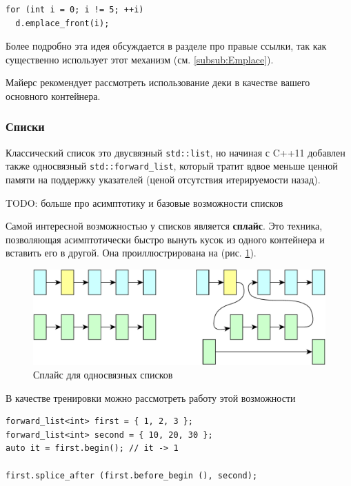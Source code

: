 \documentclass[a4paper,12pt,oneside]{article}
\begin{document}
\begin{lstlisting}
for (int i = 0; i != 5; ++i)
  d.emplace_front(i);
\end{lstlisting}

Более подробно эта идея обсуждается в разделе про правые ссылки, так как существенно использует этот механизм (см. \ref{subsub:Emplace}).

Майерс \cite{effmoderncpp} рекомендует рассмотреть использование деки в качестве вашего основного контейнера.

\subsubsection{Списки}

Классический список это двусвязный \lstinline!std::list!, но начиная с C++11 добавлен также односвязный \lstinline!std::forward_list!, который тратит вдвое меньше ценной памяти на поддержку указателей (ценой отсутствия итерируемости назад).

TODO: больше про асимптотику и базовые возможности списков

Самой интересной возможностью у списков является \textbf{сплайс}. Это техника, позволяющая асимптотически быстро вынуть кусок из одного контейнера и вставить его в другой. Она проиллюстрирована на (рис. \ref{fig:list_splice}).

\begin{figure}[h!]
\centering
\includegraphics[width=1.0\textwidth]{illustrations/list-splice-crop.pdf}
\caption{Сплайс для односвязных списков}
\label{fig:list_splice}
\end{figure}

В качестве тренировки можно рассмотреть работу этой возможности 

\begin{lstlisting}
forward_list<int> first = { 1, 2, 3 }; 
forward_list<int> second = { 10, 20, 30 }; 
auto it = first.begin(); // it -> 1

first.splice_after (first.before_begin (), second);
\end{lstlisting}
\end{document}
